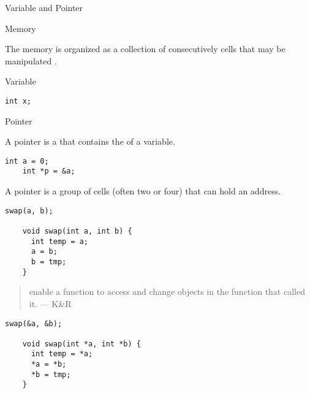 \begin{frame}{}
  \centerline{\Large Variable and Pointer}
\end{frame}

\begin{frame}{Memory}
  \begin{definition}[Memory (K\&R)]
    The memory is organized as a collection of consecutively  cells
    that may be manipulated .
  \end{definition}

\end{frame}

\begin{frame}[fragile]{Variable}
  \begin{lstlisting}[style = CStyle]
                  int x;
  \end{lstlisting}
\end{frame}

\begin{frame}[fragile]{Pointer}
  \begin{definition}[Pointer (K\&R)]
    A pointer is a  that contains the  of a variable.
  \end{definition}

  \vspace{0.50cm}
  \begin{lstlisting}[style = Cstyle]
    int a = 0;
    int *p = &a;
  \end{lstlisting}

  \vspace{0.50cm}
  \pause
  \begin{definition}
    A pointer is a group of cells (often two or four) that can hold an address.
  \end{definition}
\end{frame}

\begin{frame}[fragile]{}
  \begin{lstlisting}[style = Cstyle]
    swap(a, b);

    void swap(int a, int b) {
      int temp = a;
      a = b;
      b = tmp;
    }
  \end{lstlisting}

  \pause
  \begin{quote}
     enable a function to access and change objects
    in the function that called it.  \hfill --- K\&R
  \end{quote}

  \pause
  \begin{lstlisting}[style = Cstyle]
    swap(&a, &b);

    void swap(int *a, int *b) {
      int temp = *a;
      *a = *b;
      *b = tmp;
    }
  \end{lstlisting}
\end{frame}
